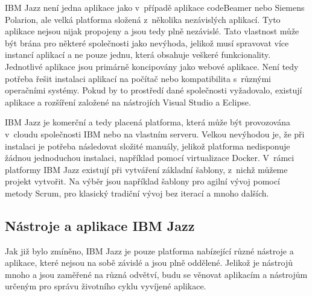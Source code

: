 \documentclass[czech,master]{diploma}
\begin{document}
IBM Jazz není jedna aplikace jako v~případě aplikace codeBeamer nebo Siemens Polarion, ale velká platforma složená z~několika nezávislých aplikací. Tyto aplikace nejsou nijak propojeny a jsou tedy plně nezávislé. Tato vlastnost může být brána pro některé společnosti jako nevýhoda, jelikož musí spravovat více instancí aplikací a ne pouze jednu, která obsahuje veškeré funkcionality. Jednotlivé aplikace jsou primárně koncipovány jako webové aplikace. Není tedy potřeba řešit instalaci aplikací na počítač nebo kompatibilita s~různými operačními systémy. Pokud by to prostředí dané společnosti vyžadovalo, existují aplikace a rozšíření založené na nástrojích Visual Studio a Eclipse.

IBM Jazz je komerční a tedy placená platforma, která může být provozována v~cloudu společnosti IBM nebo na vlastním serveru. Velkou nevýhodou je, že při instalaci je potřeba následovat složité manuály, jelikož platforma nedisponuje žádnou jednoduchou instalaci, například pomocí virtualizace Docker. V~rámci platformy IBM Jazz existují při vytváření základní šablony, z~nichž můžeme projekt vytvořit.  Na výběr jsou například šablony pro agilní vývoj pomocí metody Scrum, pro klasický tradiční vývoj bez iterací a mnoho dalších.


\subsection{Nástroje a aplikace IBM Jazz}
Jak již bylo zmíněno, IBM Jazz je pouze platforma nabízející různé nástroje a aplikace, které nejsou na sobě závislé a jsou plně oddělené. Jelikož je nástrojů mnoho a jsou zaměřené na různá odvětví, budu se věnovat aplikacím a nástrojům určeným pro správu životního cyklu vyvíjené aplikace. \cite{ref:jazz_products}
\end{document}

